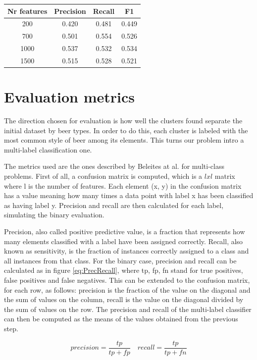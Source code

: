 \documentclass[12pt]{article}
\begin{document}
	\begin{center}
		\label{tab:features}
		\begin{tabular}{ |c|c|c|c| } 
			\hline
			Nr features & Precision & Recall & F1 \\
			\hline
			200 & 0.420 & 0.481 & 0.449 \\
			700 & 0.501 & 0.554 & 0.526 \\
			1000 & 0.537 & 0.532 & 0.534 \\
			1500 & 0.515 & 0.528 & 0.521 \\
			\hline
		\end{tabular}
	\end{center}

	\section{Evaluation metrics}
	The direction chosen for evaluation is how well the clusters found separate the initial dataset by beer types. In order to do this, each cluster is labeled with the most common style of beer among its elements. This turns our problem intro a multi-label classification one.
	
	The metrics used are the ones described by Beleites at al.\cite{MultilabelClassification} for multi-class problems. First of all, a confusion matrix is computed, which is a \(lxl\) matrix where l is the number of features. Each element (x, y) in the confusion matrix has a value meaning how many times a data point with label x has been classified as having label y. Precision and recall are then calculated for each label, simulating the binary evaluation. 
	
	Precision, also called positive predictive value, is a fraction that represents how many elements classified with a label have been assigned correctly. Recall, also known as sensitivity, is the fraction of instances correctly assigned to a class and all instances from that class. For the binary case, precision and recall can be calculated as in figure \ref{eq:PrecRecall}, where tp, fp, fn stand for true positives, false positives and false negatives. This can be extended to the confusion matrix, for each row, as follows: precision is the fraction of the value on the diagonal and the sum of values on the column, recall is the value on the diagonal divided by the sum of values on the row. The precision and recall of the multi-label classifier can then be computed as the means of the values obtained from the previous step.
	
	\begin{equation}
	\label{eq:PrecRecall}
	precision = \frac{tp}{tp + fp} \quad recall = \frac{tp}{tp + fn}
	\end{equation}
	
\end{document}

